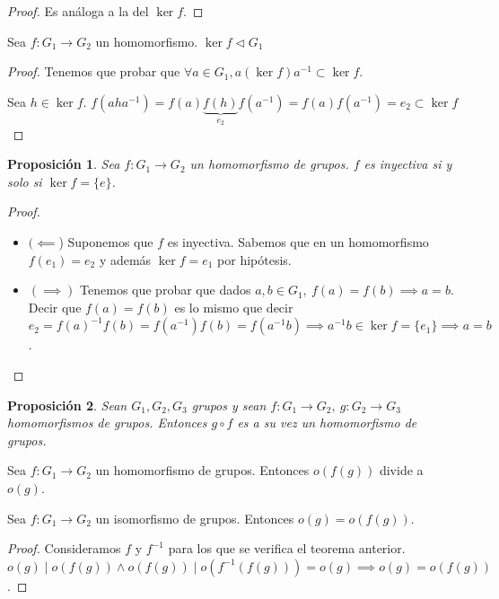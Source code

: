 \documentclass{book}
\newtheorem{pro}{Proposición}
\theoremstyle{definition}
\theoremstyle{remark}
\newcommand{\normsub}{\mathbin{\triangleleft}}
\begin{document}
\begin{proof} Es análoga a la del $\ker f$.\end{proof}

\begin{thm}
	Sea $f : G_1 \to G_2$ un homomorfismo. $\ker f \normsub G_1$
\end{thm}

\begin{proof}
	Tenemos que probar que $\forall a \in G_1, a (\ker f) a^{-1} \subset \ker f$.
	
	Sea $h \in \ker f$. $f(a h a^{-1}) = f(a)\underbrace{f(h)}_{e_2}f(a^{-1}) = f(a)f(a^{-1}) = e_2\subset \ker f$
\end{proof}

\begin{pro}
	Sea $f:G_1 \to G_2$ un homomorfismo de grupos. $f$ es inyectiva si y solo si $\ker f = \{e\}$.
\end{pro}

\begin{proof}$ $ \newline
	\begin{itemize}
		\item $(\impliedby$) Suponemos que $f$ es inyectiva. Sabemos que en un homomorfismo $f(e_1) = e_2$ y además $\ker f = {e_1}$ por hipótesis.
		\item $(\implies)$ Tenemos que probar que dados $a,b \in G_1,\ f(a) = f(b) \implies a = b$. Decir que $f(a) = f(b)$ es lo mismo que decir $e_2 = f(a)^{-1}f(b) = f(a^{-1}) f(b) = f(a^{-1}b) \implies a^{-1}b \in \ker f = \{e_1\} \implies a = b$.
	\end{itemize}
\end{proof}

\begin{pro}
	Sean $G_1, G_2, G_3$ grupos y sean $f:G_1 \to G_2,\ g:G_2 \to G_3$ homomorfismos de grupos. Entonces $g \circ f$ es a su vez un homomorfismo de grupos.
\end{pro}

\begin{thm}
	Sea $f:G_1 \to G_2$ un homomorfismo de grupos. Entonces $o(f(g))$ divide a $o(g)$.
\end{thm}

\begin{thm}
	Sea $f:G_1 \to G_2$ un isomorfismo de grupos. Entonces $o(g) = o(f(g))$.
\end{thm}

\begin{proof}
	Consideramos $f$ y $f^{-1}$ para los que se verifica el teorema anterior. $o(g) \mid o(f(g)) \land o(f(g)) \mid o(f^{-1}(f(g))) = o(g) \implies o(g) = o(f(g))$. 
\end{proof}
\end{document}
